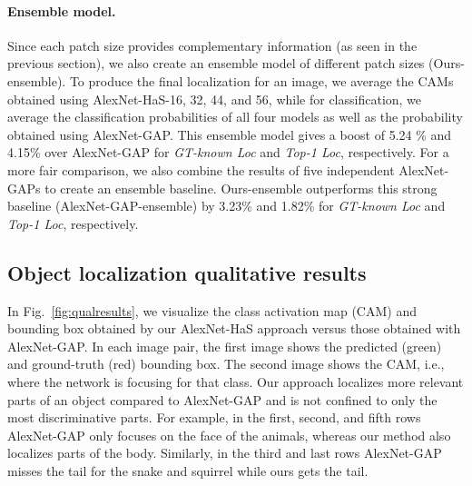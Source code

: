\documentclass[10pt,twocolumn,letterpaper]{article}
\begin{document}
\vspace{-10pt}\paragraph{Ensemble model.}  Since each patch size provides complementary information (as seen in the previous section), we also create an ensemble model of different patch sizes (Ours-ensemble).  To produce the final localization for an image, we average the CAMs obtained using AlexNet-HaS-16, 32, 44, and 56, while for classification, we average the classification probabilities of all four models as well as the probability obtained using AlexNet-GAP.  This ensemble model gives a boost of 5.24 \% and 4.15\% over AlexNet-GAP for \emph{GT-known Loc} and \emph{Top-1 Loc}, respectively.  For a more fair comparison, we also combine the results of five independent AlexNet-GAPs to create an ensemble baseline.  Ours-ensemble outperforms this strong baseline (AlexNet-GAP-ensemble) by 3.23\% and 1.82\% for \emph{GT-known Loc} and \emph{Top-1 Loc}, respectively.

\subsection{Object localization qualitative results}In Fig.~\ref{fig:qualresults}, we visualize the class activation map (CAM) and bounding box obtained by our AlexNet-HaS approach versus those obtained with AlexNet-GAP.  In each image pair, the first image shows the predicted (green) and ground-truth (red) bounding box. The second image shows the CAM, i.e., where the network is focusing for that class.  Our approach localizes more relevant parts of an object compared to AlexNet-GAP and is not confined to only the most discriminative parts. For example, in the first, second, and fifth rows AlexNet-GAP only focuses on the face of the animals, whereas our method also localizes parts of the body.  Similarly, in the third and last rows AlexNet-GAP misses the tail for the snake and squirrel while ours gets the tail. 
\end{document}
